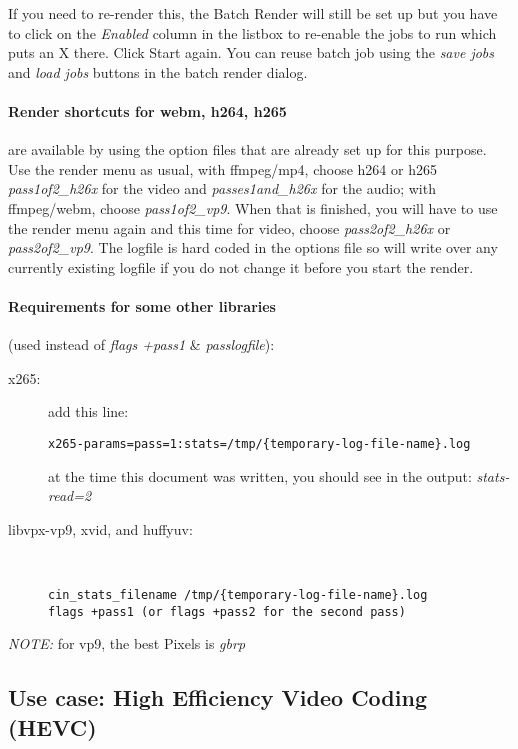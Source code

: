 If you need to re-render this, the Batch Render will still be set up
but you have to click on the \textit{Enabled} column in the listbox
to re-enable the jobs to run which puts an X there.  Click Start
again. You can reuse batch job using the \textit{save jobs} and
\textit{load jobs} buttons in the batch render dialog.

\paragraph{Render shortcuts for webm, h264, h265} are available by
using the option files that are already set up for this purpose.
Use the render menu as usual, with ffmpeg/mp4, choose h264 or h265
\textit{pass1of2\_h26x} for the video and
\textit{passes1and\_h26x} for the audio; with ffmpeg/webm, choose
\textit{pass1of2\_vp9}.  When that is finished, you will have to use
the render menu again and this time for video, choose
\textit{pass2of2\_h26x} or \textit{pass2of2\_vp9}.  The logfile is
hard coded in the options file so will write over any currently
existing logfile if you do not change it before you start the
render.

\paragraph{Requirements for some other libraries} (used instead
of \textit{flags +pass1} \& \textit{passlogfile}):
\begin{description}
\item[x265:] add this line:
\begin{lstlisting}[style=sh]
x265-params=pass=1:stats=/tmp/{temporary-log-file-name}.log
\end{lstlisting} at the time this document was written, you should
  see in the output: \textit{stats-read=2}
\item[libvpx-vp9, xvid, and huffyuv:]~
\begin{lstlisting}[style=sh]
cin_stats_filename /tmp/{temporary-log-file-name}.log
flags +pass1 (or flags +pass2 for the second pass)
\end{lstlisting}
\end{description}

\textit{NOTE:} for vp9, the best Pixels is \textit{gbrp}

\subsection{Use case: High Efficiency Video Coding (HEVC)}%
\label{sub:use_case_hevc}

